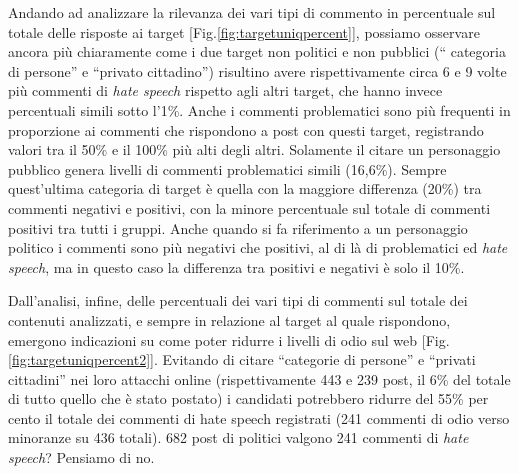 Andando ad analizzare la rilevanza dei vari tipi di commento in percentuale sul totale delle risposte ai target [Fig.\ref{fig:targetuniqpercent}], possiamo osservare ancora più chiaramente come i due target non politici e non pubblici (“ categoria di persone” e “privato cittadino”) risultino avere rispettivamente circa 6 e 9 volte più commenti di \textit{hate speech} rispetto agli altri target, che hanno invece percentuali simili sotto l'1\%. Anche i commenti problematici sono più frequenti in proporzione ai commenti che rispondono a post con questi target, registrando valori tra il 50\% e il 100\% più alti degli altri. Solamente il citare un personaggio pubblico genera livelli di commenti problematici simili (16,6\%). Sempre quest'ultima categoria di target è quella con la maggiore differenza (20\%) tra commenti negativi e positivi, con la minore percentuale sul totale di commenti positivi tra tutti i gruppi. Anche quando si fa riferimento a un personaggio politico i commenti sono più negativi che positivi, al di là di problematici ed \textit{hate speech}, ma in questo caso la differenza tra positivi e negativi è solo il 10\%.

Dall’analisi, infine, delle percentuali dei vari tipi di commenti sul totale dei contenuti analizzati, e sempre in relazione al target al quale rispondono, emergono indicazioni su come poter ridurre i livelli di odio sul web [Fig.\ref{fig:targetuniqpercent2}]. Evitando di citare “categorie di persone” e “privati cittadini” nei loro attacchi online (rispettivamente 443 e 239 post, il 6\% del totale di tutto quello che è stato postato) i candidati potrebbero ridurre del 55\% per cento il totale dei commenti di hate speech registrati (241 commenti di odio verso minoranze su 436 totali). 682 post di politici valgono 241 commenti di \textit{hate speech}? Pensiamo di no.

